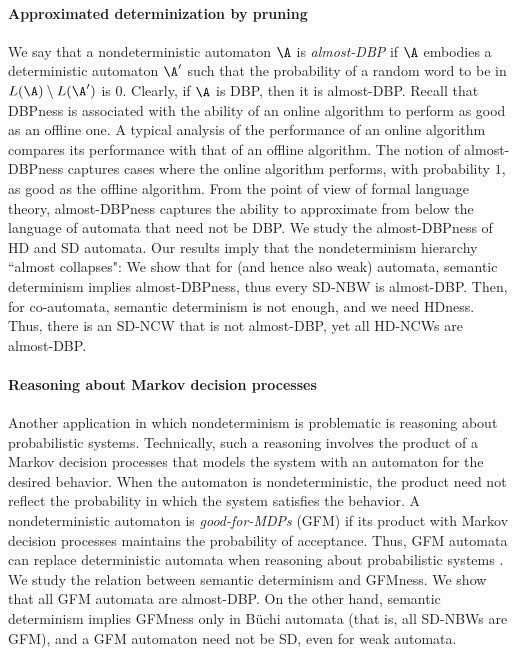 \documentclass{lmcs}
\begin{document}
\paragraph{Approximated determinization by pruning}
We say that a nondeterministic automaton $\A$ is {\em almost-DBP} if $\A$ embodies a deterministic automaton $\A'$ such that the probability of a random word to be in $L(\A)\setminus L(\A')$ is $0$. Clearly, if $\A$ is DBP, then it is almost-DBP. 
Recall that DBPness is associated with the ability of an online algorithm to perform as good as an offline one. A typical analysis of the performance of an online algorithm compares its performance with that of an offline algorithm. 
The notion of almost-DBPness captures cases where the online algorithm performs, with probability $1$, as good as the offline algorithm. From the point of view of formal language theory, almost-DBPness captures the ability to approximate from below the language of automata that need not be DBP.  
We study the almost-DBPness of HD and SD automata. Our results imply that the nondeterminism hierarchy ``almost collapses":
We show that for \buchi (and hence also weak) automata, semantic determinism implies almost-DBPness, thus every SD-NBW is almost-DBP. Then, for co-\buchi automata, semantic determinism is not enough, and we need HDness. Thus, there is an SD-NCW that is not almost-DBP, yet all HD-NCWs are almost-DBP. 

\paragraph{Reasoning about Markov decision processes}
Another application in which nondeterminism is problematic is reasoning about probabilistic systems. 
Technically, such a reasoning involves the product of a Markov decision processes that models the system with an automaton for the desired behavior. When the automaton is nondeterministic, the product need not reflect the probability in which the system satisfies the behavior.  A nondeterministic automaton is {\em good-for-MDPs} (GFM) if its product  with Markov decision processes maintains the probability of acceptance. Thus, GFM automata can replace deterministic automata when reasoning about probabilistic systems \cite{HPSSTWW20,STZ22}. 
We study the relation between semantic determinism and GFMness. We show that all GFM automata are almost-DBP. On the other hand, semantic determinism implies GFMness only in B\"uchi automata (that is, all SD-NBWs are GFM), and a GFM automaton need not be SD, even for weak automata. 
\end{document}
